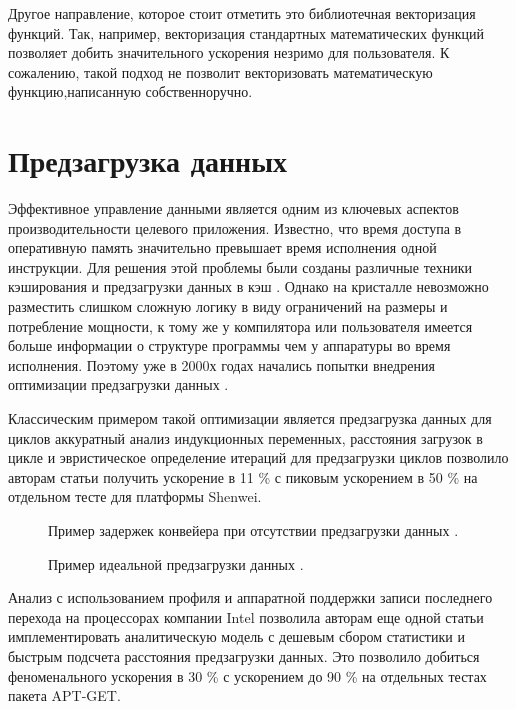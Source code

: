 Другое направление, которое стоит отметить это библиотечная векторизация функций. Так, например, векторизация стандартных  математических функций \cite{petrogalli2018llvm} позволяет добить значительного ускорения незримо для пользователя. К сожалению, такой подход не позволит векторизовать математическую функцию,написанную собственноручно.
 
 
\section{Предзагрузка данных} \label{pr:prefetch}
Эффективное управление данными является одним из ключевых аспектов производительности целевого приложения. Известно, что время доступа в оперативную память значительно превышает время исполнения одной инструкции. Для решения этой проблемы были созданы различные техники кэширования и предзагрузки данных в кэш \cite{smith1987design, tse1998cpu}.  Однако на кристалле невозможно разместить слишком сложную логику в виду ограничений на размеры и потребление мощности, к тому же у компилятора или пользователя имеется больше информации о структуре программы чем у аппаратуры во время исполнения. Поэтому уже в 2000х годах начались попытки внедрения оптимизации предзагрузки данных \cite{vanderwiel2000data}. 

Классическим примером такой оптимизации является предзагрузка данных для циклов \cite{chai2021implementation} аккуратный анализ индукционных переменных, расстояния загрузок в цикле и эвристическое определение итераций для предзагрузки циклов позволило авторам статьи \cite{chai2021implementation} получить ускорение в 11 \% с пиковым ускорением в 50 \%  на отдельном тесте для платформы Shenwei. 

 \begin{figure}[htbp]
	\centering
	
	\caption{Пример задержек конвейера при отсутствии предзагрузки данных \cite{chai2021implementation}.}
	\label{partReview:prefetch1}
\end{figure}

 \begin{figure}[htbp]
	\centering
	
	\caption{Пример идеальной предзагрузки данных \cite{chai2021implementation}.}
	\label{partReview:prefetch2}
\end{figure}

Анализ с использованием профиля и аппаратной поддержки записи последнего перехода на процессорах компании Intel позволила авторам еще одной статьи \cite{jamilan2022apt}  имплементировать аналитическую модель с дешевым сбором статистики и быстрым подсчета расстояния предзагрузки данных. Это позволило добиться феноменального ускорения в 30 \% с ускорением до 90 \% на отдельных тестах пакета APT-GET. 

